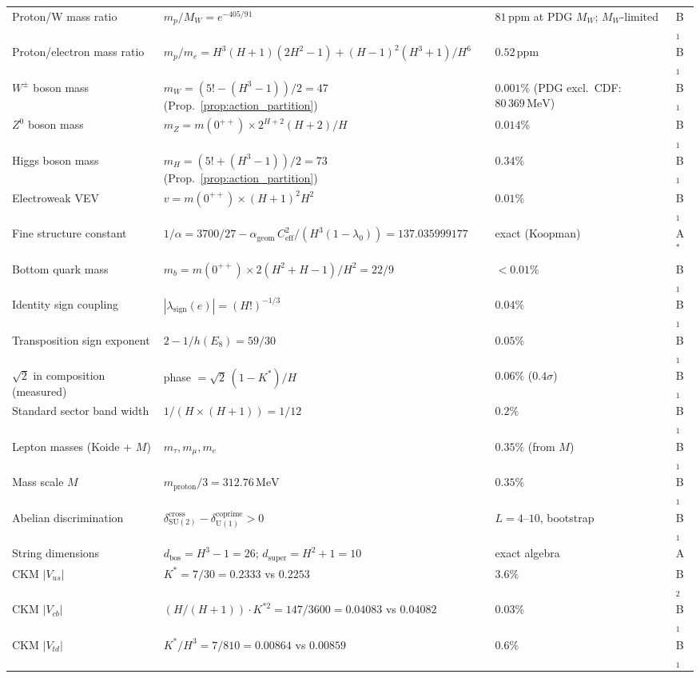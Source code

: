 \documentclass[11pt,a4paper]{article}
\theoremstyle{definition}
\theoremstyle{remark}
\newcommand{\SU}{\mathrm{SU}}
\begin{document}
\begin{longtable}{p{3.8cm}p{7.2cm}p{3.0cm}l}
Proton/W mass ratio & $m_p/M_W = e^{-405/91}$ & $81\,\mathrm{ppm}$ at PDG $M_W$; $M_W$-limited & B$_1$ \\
Proton/electron mass ratio & $m_p/m_e = H^3(H+1)(2H^2-1)+(H-1)^2(H^3+1)/H^6$ & $0.52\,\mathrm{ppm}$ & B$_1$ \\
$W^\pm$ boson mass & $m_W = (5!-(H^3-1))/2 = 47$ (Prop.~\ref{prop:action_partition}) & $0.001\%$ (PDG excl.\ CDF: $80\,369\,\mathrm{MeV}$) & B$_1$ \\
$Z^0$ boson mass & $m_Z = m(0^{++})\times 2^{H+2}(H+2)/H$ & $0.014\%$ & B$_1$ \\
Higgs boson mass & $m_H = (5!+(H^3-1))/2 = 73$ (Prop.~\ref{prop:action_partition}) & $0.34\%$ & B$_1$ \\
Electroweak VEV & $v = m(0^{++})\times(H+1)^2 H^2$ & $0.01\%$ & B$_1$ \\
Fine structure constant & $1/\alpha=3700/27-\alpha_{\mathrm{geom}}\,C_{\mathrm{eff}}^2/(H^3(1\!-\!\lambda_0))=137.035999177$ & exact (Koopman) & A$^*$ \\
Bottom quark mass & $m_b = m(0^{++})\times 2(H^2+H-1)/H^2 = 22/9$ & $<0.01\%$ & B$_1$ \\
Identity sign coupling & $|\lambda_{\mathrm{sign}}(e)| = (H!)^{-1/3}$ & $0.04\%$ & B$_1$ \\
Transposition sign exponent & $2 - 1/h(E_8) = 59/30$ & $0.05\%$ & B$_1$ \\
$\sqrt{2}$ in composition (measured) & phase $= \sqrt{2}\,(1-K^*)/H$ & $0.06\%$ ($0.4\sigma$) & B$_1$ \\
Standard sector band width & $1/(H \times (H+1)) = 1/12$ & $0.2\%$ & B$_1$ \\
Lepton masses (Koide + $M$) & $m_\tau, m_\mu, m_e$ & $0.35\%$ (from $M$) & B$_1$ \\
Mass scale $M$ & $m_{\mathrm{proton}}/3 = 312.76\,\mathrm{MeV}$ & $0.35\%$ & B$_1$ \\
Abelian discrimination & $\delta_{\SU(2)}^{\mathrm{cross}} - \delta_{\mathrm{U}(1)}^{\mathrm{coprime}} > 0$ & $L\!=\!4$--$10$, bootstrap & B$_1$ \\
String dimensions & $d_\mathrm{bos}=H^3-1=26$; $d_\mathrm{super}=H^2+1=10$ & exact algebra & A \\
CKM $|V_{us}|$ & $K^* = 7/30 = 0.2333$ vs $0.2253$ & $3.6\%$ & B$_2$ \\
CKM $|V_{cb}|$ & $(H/(H+1))\cdot K^{*2} = 147/3600 = 0.04083$ vs $0.04082$ & $0.03\%$ & B$_1$ \\
CKM $|V_{td}|$ & $K^*/H^3=7/810=0.00864$ vs $0.00859$ & $0.6\%$ & B$_1$ \\

\end{longtable}
\end{document}
